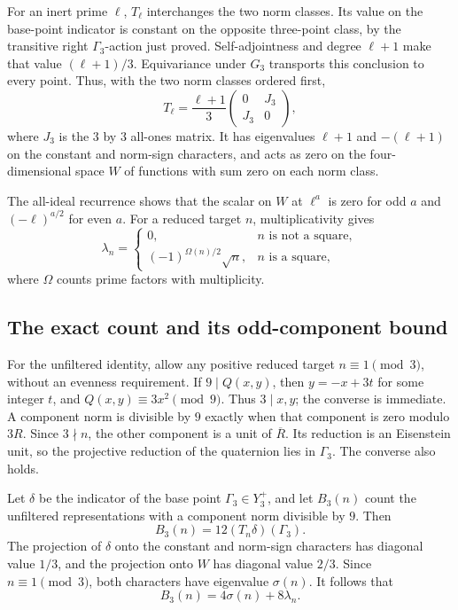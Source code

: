 For an inert prime $\ell$, $T_\ell$ interchanges the two norm classes.
Its value on the base-point indicator is constant on the opposite
three-point class, by the transitive right $\Gamma_3$-action just proved.
Self-adjointness and degree $\ell+1$ make that value $(\ell+1)/3$.
Equivariance under $G_3$ transports this conclusion to every point. Thus,
with the two norm classes ordered first,
\[
T_\ell=\frac{\ell+1}{3}
\begin{pmatrix}0&J_3\\J_3&0\end{pmatrix},
\]
where $J_3$ is the $3$ by $3$ all-ones matrix.
It has eigenvalues $\ell+1$ and $-(\ell+1)$ on the constant and norm-sign
characters, and acts as zero on the four-dimensional space $W$ of
functions with sum zero on each norm class.

The all-ideal recurrence shows that the scalar on $W$ at $\ell^a$ is
zero for odd $a$ and $(-\ell)^{a/2}$ for even $a$. For a reduced target
$n$, multiplicativity gives
\[
\lambda_n=
\begin{cases}
0,&n\text{ is not a square},\\
(-1)^{\Omega(n)/2}\sqrt n,&n\text{ is a square},
\end{cases}
\]
where $\Omega$ counts prime factors with multiplicity.

\subsection{The exact count and its odd-component bound}
For the unfiltered identity, allow any positive reduced target
$n\equiv1\pmod3$, without an evenness requirement. If
$9\mid Q(x,y)$, then $y=-x+3t$ for some integer $t$, and
$Q(x,y)\equiv3x^2\pmod9$. Thus $3\mid x,y$; the converse is immediate.
A component norm is divisible by $9$ exactly when that component is zero
modulo $3R$. Since $3\nmid n$, the other component is a unit of
$\overline R$. Its reduction is an Eisenstein unit, so the projective
reduction of the quaternion lies in $\Gamma_3$. The converse also holds.

Let $\delta$ be the indicator of the base point $\Gamma_3\in Y_3^+$,
and let $B_3(n)$ count the unfiltered representations with a component
norm divisible by $9$. Then
\[
B_3(n)=12(T_n\delta)(\Gamma_3).
\]
The projection of $\delta$ onto the constant and norm-sign characters
has diagonal value $1/3$, and the projection onto $W$ has diagonal
value $2/3$. Since $n\equiv1\pmod3$, both characters have eigenvalue
$\sigma(n)$. It follows that
\begin{equation}\label{eq:ramified-exact}
B_3(n)=4\sigma(n)+8\lambda_n.
\end{equation}

